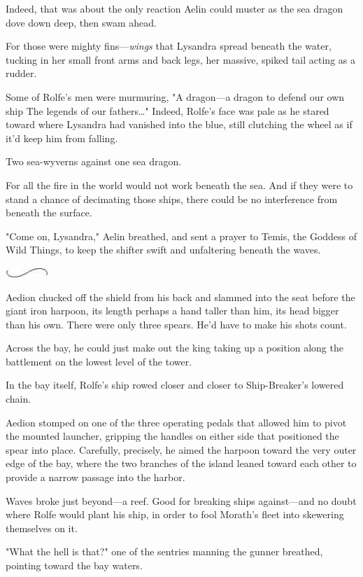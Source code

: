 Indeed, that was about the only reaction Aelin could muster as the sea dragon dove down deep, then swam ahead.

For those were mighty fins---\emph{wings} that Lysandra spread beneath the water, tucking in her small front arms and back legs, her massive, spiked tail acting as a rudder.

Some of Rolfe's men were murmuring, "A dragon---a dragon to defend our own ship  The legends of our fathers\ldots" Indeed, Rolfe's face was pale as he stared toward where Lysandra had vanished into the blue, still clutching the wheel as if it'd keep him from falling.

Two sea-wyverns  against one sea dragon.

For all the fire in the world would not work beneath the sea. And if they were to stand a chance of decimating those ships, there could be no interference from beneath the surface.

"Come on, Lysandra," Aelin breathed, and sent a prayer to Temis, the Goddess of Wild Things, to keep the shifter swift and unfaltering beneath the waves.

\includegraphics[width=0.65in,height=0.13in]{images/seperator}

Aedion chucked off the shield from his back and slammed into the seat before the giant iron harpoon, its length perhaps a hand taller than him, its head bigger than his own. There were only three spears. He'd have to make his shots count.

Across the bay, he could just make out the king taking up a position along the battlement on the lowest level of the tower.

In the bay itself, Rolfe's ship rowed closer and closer to Ship-Breaker's lowered chain.

Aedion stomped on one of the three operating pedals that allowed him to pivot the mounted launcher, gripping the handles on either side that positioned the spear into place. Carefully, precisely, he aimed the harpoon toward the very outer edge of the bay, where the two branches of the island leaned toward each other to provide a narrow passage into the harbor.

Waves broke just beyond---a reef. Good for breaking ships against---and no doubt where Rolfe would plant his ship, in order to fool Morath's fleet into skewering themselves on it.

"What the hell is that?" one of the sentries manning the gunner breathed, pointing toward the bay waters.

